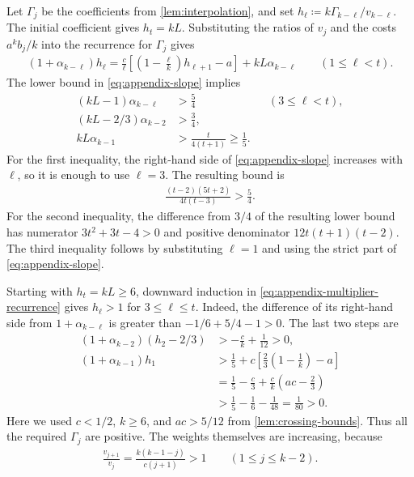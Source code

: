 Let $\Gamma_j$ be the coefficients from \cref{lem:interpolation}, and set $h_\ell\coloneqq k\Gamma_{k-\ell}/v_{k-\ell}$. The initial coefficient gives $h_t=kL$. Substituting the ratios of $v_j$ and the costs $a^kb_j/k$ into the recurrence for $\Gamma_j$ gives
\begin{align}\label{eq:appendix-multiplier-recurrence}
(1+\alpha_{k-\ell})h_\ell
=\frac c\ell\left[\left(1-\frac\ell k\right)h_{\ell+1}-a\right]
+kL\alpha_{k-\ell}
\qquad(1\le\ell<t).
\end{align}
The lower bound in \cref{eq:appendix-slope} implies
\begin{align*}
(kL-1)\alpha_{k-\ell}&>\frac54 &&(3\le\ell<t),\\
(kL-2/3)\alpha_{k-2}&>\frac34,\\
kL\alpha_{k-1}&>\frac{t}{4(t+1)}\ge\frac15.
\end{align*}
For the first inequality, the right-hand side of \cref{eq:appendix-slope} increases with $\ell$, so it is enough to use $\ell=3$. The resulting bound is
\begin{align*}
\frac{(t-2)(5t+2)}{4t(t-3)}>\frac54.
\end{align*}
For the second inequality, the difference from $3/4$ of the resulting lower bound has numerator $3t^2+3t-4>0$ and positive denominator $12t(t+1)(t-2)$. The third inequality follows by substituting $\ell=1$ and using the strict part of \cref{eq:appendix-slope}.

Starting with $h_t=kL\ge6$, downward induction in \cref{eq:appendix-multiplier-recurrence} gives $h_\ell>1$ for $3\le\ell\le t$. Indeed, the difference of its right-hand side from $1+\alpha_{k-\ell}$ is greater than $-1/6+5/4-1>0$. The last two steps are
\begin{align*}
(1+\alpha_{k-2})(h_2-2/3)&>-\frac ck+\frac1{12}>0,\\
(1+\alpha_{k-1})h_1
&>\frac15+c\left[\frac23\left(1-\frac1k\right)-a\right]\\
&=\frac15-\frac c3+\frac ck\left(ac-\frac23\right)\\
&>\frac15-\frac16-\frac1{48}=\frac1{80}>0.
\end{align*}
Here we used $c<1/2$, $k\ge6$, and $ac>5/12$ from \cref{lem:crossing-bounds}. Thus all the required $\Gamma_j$ are positive. The weights themselves are increasing, because
\begin{align*}
\frac{v_{j+1}}{v_j}=\frac{k(k-1-j)}{c(j+1)}>1
\qquad(1\le j\le k-2).
\end{align*}

